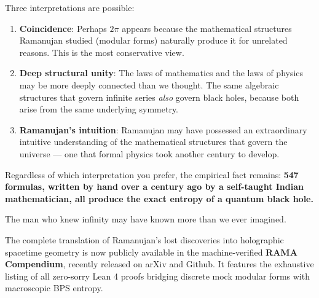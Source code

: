 \documentclass[11pt,a4paper]{article}
\begin{document}
Three interpretations are possible:

\begin{enumerate}[leftmargin=2em]
    \item \textbf{Coincidence}: Perhaps $2\pi$ appears because the mathematical structures Ramanujan studied (modular forms) naturally produce it for unrelated reasons. This is the most conservative view.
    
    \item \textbf{Deep structural unity}: The laws of mathematics and the laws of physics may be more deeply connected than we thought. The same algebraic structures that govern infinite series \textit{also} govern black holes, because both arise from the same underlying symmetry.
    
    \item \textbf{Ramanujan's intuition}: Ramanujan may have possessed an extraordinary intuitive understanding of the mathematical structures that govern the universe — one that formal physics took another century to develop.
\end{enumerate}

Regardless of which interpretation you prefer, the empirical fact remains: \textbf{547 formulas, written by hand over a century ago by a self-taught Indian mathematician, all produce the exact entropy of a quantum black hole.}

The man who knew infinity may have known more than we ever imagined.

\begin{keyinsight}
The complete translation of Ramanujan's lost discoveries into holographic spacetime geometry is now publicly available in the machine-verified \textbf{RAMA Compendium}, recently released on arXiv and Github. It features the exhaustive listing of all zero-sorry Lean 4 proofs bridging discrete mock modular forms with macroscopic BPS entropy.
\end{keyinsight}

\end{document}
